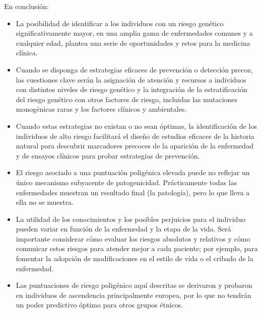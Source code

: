 En conclusión:
\begin{itemize}
\item La posibilidad de identificar a los individuos con un riesgo genético significativamente mayor, en una amplia gama de enfermedades comunes y a cualquier edad, plantea una serie de oportunidades y retos para la medicina clínica.
\item Cuando se disponga de estrategias eficaces de prevención o detección precoz, las cuestiones clave serán la asignación de atención y recursos a individuos con distintos niveles de riesgo genético y la integración de la estratificación del riesgo genético con otros factores de riesgo, incluidas las mutaciones monogénicas raras y los factores clínicos y ambientales.
\item Cuando estas estrategias no existan o no sean óptimas, la identificación de los individuos de alto riesgo facilitará el diseño de estudios eficaces de la historia natural para descubrir marcadores precoces de la aparición de la enfermedad y de ensayos clínicos para probar estrategias de prevención.
\item El riesgo asociado a una puntuación poligénica elevada puede no reflejar un único mecanismo subyacente de patogenicidad. Prácticamente todas las enfermedades muestran un resultado final (la patología), pero lo que lleva a ella no se muestra.
\item La utilidad de los conocimientos y los posibles perjuicios para el individuo pueden variar en función de la enfermedad y la etapa de la vida. Será importante considerar cómo evaluar los riesgos absolutos y relativos y cómo comunicar estos riesgos para atender mejor a cada paciente; por ejemplo, para fomentar la adopción de modificaciones en el estilo de vida o el cribado de la enfermedad.
\item Las puntuaciones de riesgo poligénico aquí descritas se derivaron y probaron en individuos de ascendencia principalmente europea, por lo que no tendrán un poder predictivo óptimo para otros grupos étnicos.
\end{itemize}
